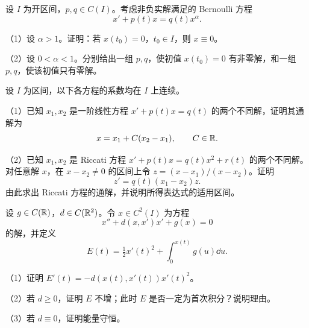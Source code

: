 \noindent\begin{minipage}{\linewidth}
设 $I$ 为开区间，$p,q\in C(I)$。考虑非负实解满足的 Bernoulli 方程
\[x'+p(t)x=q(t)x^\alpha.\]
\par（1）设 $\alpha>1$。证明：若 $x(t_0)=0$，$t_0\in I$，则 $x\equiv0$。
\par（2）设 $0<\alpha<1$。分别给出一组 $p,q$，使初值 $x(t_0)=0$ 有非零解，和一组 $p,q$，使该初值只有零解。
\end{minipage}\par\vspace{5pt}
\noindent\begin{minipage}{\linewidth}
设 $I$ 为区间，以下各方程的系数均在 $I$ 上连续。
\par（1）已知 $x_1,x_2$ 是一阶线性方程 $x'+p(t)x=q(t)$ 的两个不同解，证明其通解为
\[x=x_1+C(x_2-x_1),\qquad C\in\mathbb R.\]
\par（2）已知 $x_1,x_2$ 是 Riccati 方程 $x'+p(t)x=q(t)x^2+r(t)$ 的两个不同解。对任意解 $x$，在 $x-x_2\ne0$ 的区间上令 $z=(x-x_1)/(x-x_2)$。证明
\[z'=q(t)(x_1-x_2)z.\]
由此求出 Riccati 方程的通解，并说明所得表达式的适用区间。
\end{minipage}\par\vspace{5pt}
\noindent\begin{minipage}{\linewidth}
设 $g\in C(\mathbb R)$，$d\in C(\mathbb R^2)$。令 $x\in C^2(I)$ 为方程
\[x''+d(x,x')x'+g(x)=0\]
的解，并定义
\[E(t)=\tfrac12x'(t)^2+\int_0^{x(t)}g(u)\dd u.\]
\par（1）证明 $E'(t)=-d(x(t),x'(t))x'(t)^2$。
\par（2）若 $d\ge0$，证明 $E$ 不增；此时 $E$ 是否一定为首次积分？说明理由。
\par（3）若 $d\equiv0$，证明能量守恒。
\end{minipage}\par\vspace{5pt}
